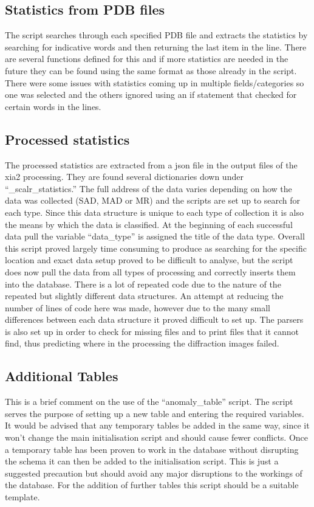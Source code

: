\documentclass[11pt, a4paper]{article}
\begin{document}
\begin{multicols}{2}
\subsection{Statistics from PDB files}
The script searches through each specified PDB file and extracts the statistics by searching for indicative words and then returning the last item in the line. There are several functions defined for this and if more statistics are needed in the future they can be found using the same format as those already in the script. There were some issues with statistics coming up in multiple fields/categories so one was selected and the others ignored using an if statement that checked for certain words in the lines. 
\subsection{Processed statistics}
The processed statistics are extracted from a json file in the output files of the xia2 processing. They are found several dictionaries down under ``\_scalr\_statistics.'' The full address of the data varies depending on how the data was collected (SAD, MAD or MR) and the scripts are set up to search for each type. Since this data structure is unique to each type of collection it is also the means by which the data is classified. At the beginning of each successful data pull the variable ``data\_type'' is assigned the title of the data type. Overall this script proved largely time consuming to produce as searching for the specific location and exact data setup proved to be difficult to analyse, but the script does now pull the data from all types of processing and correctly inserts them into the database. There is a lot of repeated code due to the nature of the repeated but slightly different data structures. An attempt at reducing the number of lines of code here was made, however due to the many small differences between each data structure it proved difficult to set up. The parsers is also set up in order to check for missing files and to print files that it cannot find, thus predicting where in the processing the diffraction images failed. 
\subsection {Additional Tables}
This is a brief comment on the use of the ``anomaly\_table'' script. The script serves the purpose of setting up a new table and entering the required variables. It would be advised that any temporary tables be added in the same way, since it won't change the main initialisation script and should cause fewer conflicts. Once a temporary table has been proven to work in the database without disrupting the schema it can then be added to the initialisation script. This is just a suggested precaution but should avoid any major disruptions to the workings of the database. For the addition of further tables this script should be a suitable template.

\end{multicols}
\end{document}
